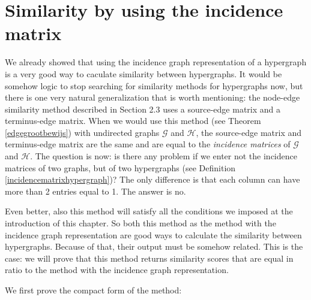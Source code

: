 \documentclass[a4paper,11pt]{report}
\newcommand{\graf}{\mathscr{G}}
\newcommand{\grafeen}{\mathscr{H}}
\begin{document}
  \section{Similarity by using the incidence matrix}
We already showed that using the incidence graph representation of a hypergraph
is a very good way to caculate similarity between hypergraphs. It would be somehow logic to stop searching for similarity methods
for hypergraphs now, but there is one very natural generalization that is worth mentioning: the node-edge similarity 
method described in Section 2.3 uses a source-edge matrix and a terminus-edge 
matrix. When we would use this method (see Theorem \ref{edgegrootbewijs}) with undirected graphs $\graf$ and $\grafeen$, the source-edge matrix and terminus-edge
matrix are the same and are equal to the \textit{incidence matrices} of $\graf$ and 
$\grafeen$. The question is now: is there any problem if we enter not the incidence matrices of two graphs, but of 
two hypergraphs (see Definition \ref{incidencematrixhypergraph})? The only difference is that each
column can have more than 2 entries equal to 1. The answer is 
no. 

Even better, also this method will satisfy all the conditions we imposed at the introduction of this chapter. 
So both this method as the method with the incidence graph representation 
are good ways to calculate the similarity between hypergraphs. Because of that, 
their output must be somehow related. This is the case: we will prove that this method 
returns similarity scores that are equal in ratio to the method with the 
incidence graph representation.

We first prove the compact form of the method:
\end{document}
